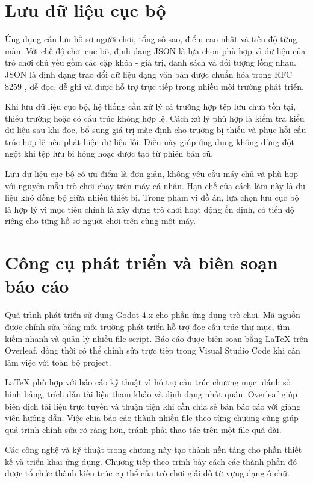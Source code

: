 ﻿\documentclass[../DoAn.tex]{subfiles}
\begin{document}
\section{Lưu dữ liệu cục bộ}
Ứng dụng cần lưu hồ sơ người chơi, tổng số sao, điểm cao nhất và tiến độ từng màn. Với chế độ chơi cục bộ, định dạng JSON là lựa chọn phù hợp vì dữ liệu của trò chơi chủ yếu gồm các cặp khóa - giá trị, danh sách và đối tượng lồng nhau. JSON là định dạng trao đổi dữ liệu dạng văn bản được chuẩn hóa trong RFC 8259 \cite{rfc8259}, dễ đọc, dễ ghi và được hỗ trợ trực tiếp trong nhiều môi trường phát triển.

Khi lưu dữ liệu cục bộ, hệ thống cần xử lý cả trường hợp tệp lưu chưa tồn tại, thiếu trường hoặc có cấu trúc không hợp lệ. Cách xử lý phù hợp là kiểm tra kiểu dữ liệu sau khi đọc, bổ sung giá trị mặc định cho trường bị thiếu và phục hồi cấu trúc hợp lệ nếu phát hiện dữ liệu lỗi. Điều này giúp ứng dụng không dừng đột ngột khi tệp lưu bị hỏng hoặc được tạo từ phiên bản cũ.

Lưu dữ liệu cục bộ có ưu điểm là đơn giản, không yêu cầu máy chủ và phù hợp với nguyên mẫu trò chơi chạy trên máy cá nhân. Hạn chế của cách làm này là dữ liệu khó đồng bộ giữa nhiều thiết bị. Trong phạm vi đồ án, lựa chọn lưu cục bộ là hợp lý vì mục tiêu chính là xây dựng trò chơi hoạt động ổn định, có tiến độ riêng cho từng hồ sơ người chơi trên cùng một máy.

\section{Công cụ phát triển và biên soạn báo cáo}
Quá trình phát triển sử dụng Godot 4.x cho phần ứng dụng trò chơi. Mã nguồn được chỉnh sửa bằng môi trường phát triển hỗ trợ đọc cấu trúc thư mục, tìm kiếm nhanh và quản lý nhiều file script. Báo cáo được biên soạn bằng LaTeX trên Overleaf, đồng thời có thể chỉnh sửa trực tiếp trong Visual Studio Code khi cần làm việc với toàn bộ project.

LaTeX phù hợp với báo cáo kỹ thuật vì hỗ trợ cấu trúc chương mục, đánh số hình bảng, trích dẫn tài liệu tham khảo và định dạng nhất quán. Overleaf giúp biên dịch tài liệu trực tuyến và thuận tiện khi cần chia sẻ bản báo cáo với giảng viên hướng dẫn. Việc chia báo cáo thành nhiều file theo từng chương cũng giúp quá trình chỉnh sửa rõ ràng hơn, tránh phải thao tác trên một file quá dài.

Các công nghệ và kỹ thuật trong chương này tạo thành nền tảng cho phần thiết kế và triển khai ứng dụng. Chương tiếp theo trình bày cách các thành phần đó được tổ chức thành kiến trúc cụ thể của trò chơi giải đố từ vựng dạng ô chữ.
\end{document}
